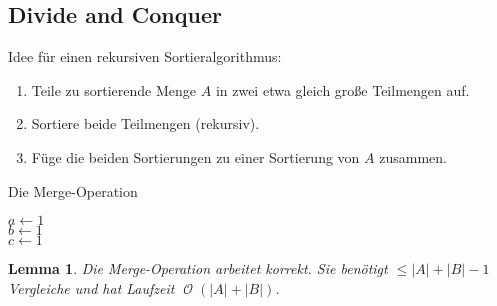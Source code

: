 \documentclass[a4paper,12pt]{article}
\DeclareMathOperator{\BigO}{\mathcal O}
\newtheorem{lemma}[axiom]{Lemma}
\theoremstyle{definition}
\begin{document}
	\subsection{Divide and Conquer}
	Idee für einen rekursiven Sortieralgorithmus:
	\begin{enumerate}[label=(\roman*)]
		\item Teile zu sortierende Menge $A$ in zwei etwa gleich große Teilmengen auf.
		\item Sortiere beide Teilmengen (rekursiv).
		\item Füge die beiden Sortierungen zu einer Sortierung von $A$ zusammen.
	\end{enumerate}
	\begin{algorithm}[H]
		\caption{Die Merge-Operation}
		$a \gets 1$\\
		$b \gets 1$\\
		$c \gets 1$
	\end{algorithm}
	\begin{lemma}
		Die Merge-Operation arbeitet korrekt. Sie benötigt $\leq \lvert A\rvert + \lvert B\rvert - 1$ Vergleiche und hat Laufzeit $\BigO(\lvert A\rvert + \lvert B\rvert)$.
	\end{lemma}
\end{document}
